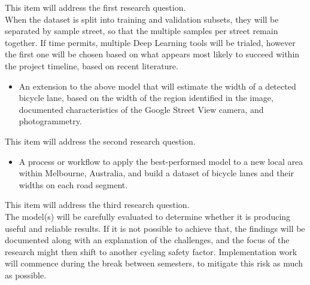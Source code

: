 \documentclass{article}
\begin{document}
This item will address the first research question.
\\

When the dataset is split into training and validation subsets, they will be separated by sample street, so that the multiple samples per street remain together.  If time permits, multiple Deep Learning tools will be trialed, however the first one will be chosen based on what appears most likely to succeed within the project timeline, based on recent literature.

\begin{itemize}
\item{An extension to the above model that will estimate the width of a detected bicycle lane, based on the width of the region identified in the image, documented characteristics of the Google Street View camera, and photogrammetry.}
\end{itemize}

This item will address the second research question.
\\

\begin{itemize}
\item{A process or workflow to apply the best-performed model to a new local area within Melbourne, Australia, and build a dataset of bicycle lanes and their widths on each road segment.}
\end{itemize}

This item will address the third research question.
\\

The model(s) will be carefully evaluated to determine whether it is producing useful and reliable results.  If it is not possible to achieve that, the findings will be documented along with an explanation of the challenges, and the focus of the research might then shift to another cycling safety factor.  Implementation work will commence during the break between semesters, to mitigate this risk as much as possible.
\\


\cleardoublepage


	
\end{document}
